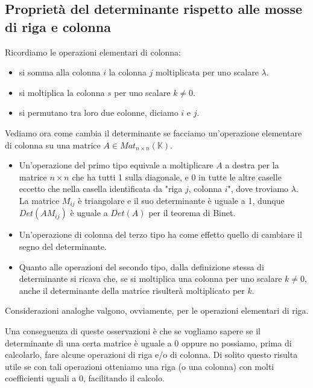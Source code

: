 
\subsection{Propriet\`a del determinante rispetto alle mosse di riga e colonna}
Ricordiamo le operazioni elementari di colonna:
\begin{itemize}
	\item si somma alla colonna $i$ la colonna $j$ moltiplicata per uno
	      scalare $\lambda$.
	\item si moltiplica la colonna $s$ per uno scalare $k \neq 0$.
	\item si permutano tra loro due colonne, diciamo $i$ e $j$.
\end{itemize}

Vediamo ora come cambia il determinante se facciamo un'operazione elementare di colonna
su una matrice $A \in Mat_{n \times n}(\mathbb{K})$.
\begin{itemize}
	\item Un'operazione del primo tipo equivale a moltiplicare $A$ a destra per la
	      matrice $n \times n$ che ha tutti 1 sulla diagonale, e 0 in tutte le altre
	      caselle eccetto che nella casella identificata da "riga $j$, colonna $i$",
	      dove troviamo $\lambda$. La matrice $M_{ij}$ \`e triangolare e il suo
	      determinante \`e uguale a 1, dunque $Det(AM_{ij})$ \`e uguale a $Det(A)$ per
	      il teorema di Binet.
	\item Un'operazione di colonna del terzo tipo ha come
	      effetto quello di cambiare il segno del determinante.
	\item Quanto alle operazioni del secondo tipo, dalla definizione stessa di
	      determinante si ricava che, se si moltiplica una colonna per uno scalare
	      $k \neq 0$, anche il determinante della matrice risulter\`a moltiplicato
	      per $k$.
\end{itemize}

Considerazioni analoghe valgono, ovviamente, per le operazioni elementari di
riga.

Una conseguenza di queste osservazioni \`e che se vogliamo sapere se il
determinante di una certa matrice \`e uguale a 0 oppure no possiamo,
prima di calcolarlo, fare alcune operazioni di riga e/o di colonna.
Di solito questo risulta utile se con tali operazioni otteniamo una riga
(o una colonna) con molti coefficienti uguali a 0, facilitando il calcolo.